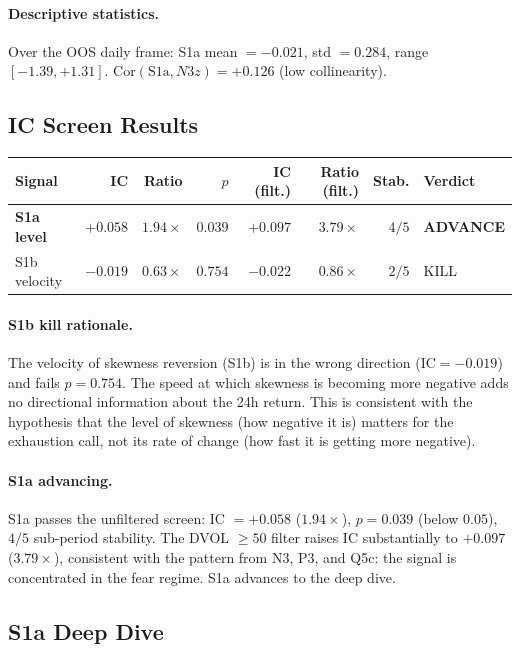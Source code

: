 \documentclass[12pt, a4paper]{article}
\theoremstyle{plain}
\theoremstyle{definition}
\newcommand{\IC}{\mathrm{IC}}
\newcommand{\Cor}{\mathrm{Cor}}
\begin{document}
\paragraph{Descriptive statistics.}
Over the OOS daily frame:
S1a mean $= -0.021$, std $= 0.284$, range $[-1.39, +1.31]$.
$\Cor(\text{S1a}, N3z) = +0.126$ (low collinearity).

\subsection{IC Screen Results}

\begin{center}
\begin{tabular}{lrrrrrrl}
\toprule
Signal & IC & Ratio & $p$ & IC (filt.) & Ratio (filt.) & Stab. & Verdict \\
\midrule
\textbf{S1a level}  & $+0.058$ & $1.94\times$ & $0.039$ & $+0.097$ & $3.79\times$ & $4/5$ & \textbf{ADVANCE} \\
S1b velocity        & $-0.019$ & $0.63\times$ & $0.754$ & $-0.022$ & $0.86\times$ & $2/5$ & KILL \\
\bottomrule
\end{tabular}
\end{center}

\paragraph{S1b kill rationale.}
The velocity of skewness reversion (S1b) is in the wrong direction
($\IC = -0.019$) and fails $p = 0.754$.  The speed at which skewness
is becoming more negative adds no directional information about the 24h
return.  This is consistent with the hypothesis that the level of
skewness (how negative it is) matters for the exhaustion call, not its
rate of change (how fast it is getting more negative).

\paragraph{S1a advancing.}
S1a passes the unfiltered screen: IC $= +0.058$ ($1.94\times$),
$p = 0.039$ (below $0.05$), $4/5$ sub-period stability.  The DVOL
$\geq 50$ filter raises IC substantially to $+0.097$ ($3.79\times$),
consistent with the pattern from N3, P3, and Q5c: the signal is
concentrated in the fear regime.  S1a advances to the deep dive.

\subsection{S1a Deep Dive}
\label{sec:s1a_deep}
\end{document}
